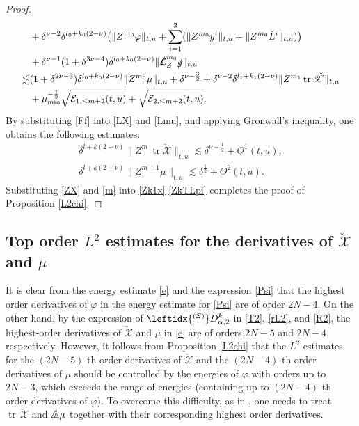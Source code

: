 \documentclass[11pt,twoside]{article}
\def\al{\alpha}
\def\vp{\varphi}
\def\f{\frac}
\def\les{\lesssim}
\begin{document}
\begin{proof}
\begin{align}
&+\delta^{\nu-2}\delta^{l_0+k_0(2-\nu)}\bigl(\|Z^{m_0}\vp\|_{t,u}+\sum_{i=1}^2(\|Z^{m_0}y^i\|_{t,u}+\|Z^{m_0}\check L^i\|_{t,u})\bigr)\nonumber\\
&+\delta^{\nu-1}(1+\delta^{3\nu-4})\delta^{l_0+k_0(2-\nu)}\|\slashed{\mathcal L}_Z^{m_0}\slashed g\|_{t,u}\nonumber\\
\lesssim&(1+\delta^{2\nu-3})\delta^{l_0+k_0(2-\nu)}\|Z^{m_0}\mu\|_{t,u}+\delta^{\nu-\f32}+\delta^{\nu-2}\delta^{l_1+k_1(2-\nu)}\|Z^{m_1}\operatorname{tr}{\check{\mathscr X}}\|_{t,u}\label{Lmu}\\
&+\mu_{\min}^{-\f12}\sqrt{\mathcal{E}_{1,\leq m+2}(t,u)}+\sqrt{\mathcal{E}_{2,\leq m+2}(t,u)}.\nonumber
\end{align}
By substituting \eqref{Ff} into \eqref{LX} and \eqref{Lmu}, and applying Gronwall's inequality, one obtains the following estimates:
\begin{align}
\delta^{l+k(2-\nu)} \| Z^{m} \, \operatorname{tr}\check{\mathscr{X}} \|_{t,u} \les \delta^{\nu-\frac{1}{2}} + \Theta^1(t,u), \label{ZX} \\
\delta^{l+k(2-\nu)} \| Z^{m+1} \mu \|_{t,u} \les \delta^{\frac{1}{2}} + \Theta^2(t,u). \label{m}
\end{align}
Substituting \eqref{ZX} and \eqref{m} into \eqref{Zk1x}-\eqref{ZkTLpi} completes the proof of Proposition \ref{L2chi}.
\end{proof}


\subsection{Top order $L^2$ estimates for the derivatives of $\check{\mathscr X}$ and $\mu$}\label{Section 6.2}

It is clear from the energy estimate \eqref{e} and the expression \eqref{Psi} that the highest order derivatives of $\varphi$ in the energy estimate for \eqref{Psi} are of order $2N-4$. On the other hand, by the expression of $\leftidx{^{(Z)}}D_{\al,2}^k$ in \eqref{T2}, \eqref{rL2}, and \eqref{R2}, the highest{-}order derivatives of $\check{\mathscr{X}}$ and $\mu$ in \eqref{e} are of orders $2N-5$ and $2N-4$, respectively. However, it follows from Proposition \ref{L2chi} that the $L^2$ estimates for the $(2N-5)$-th order derivatives of $\check{\mathscr{X}}$ and the $(2N-4)$-th order derivatives of $\mu$ should be controlled by the energies of $\vp$ with orders up to $2N-3$, which exceeds the range of energies (containing up to $(2N-4)$-th order derivatives of $\vp$). To overcome this difficulty, as in \cite{Ch1, M-Y, Sp}, one needs to treat $\operatorname{tr}\,\check{\mathscr{X}}$ and $\slashed{\triangle}\mu$ together with their corresponding highest order derivatives.
\end{document}
